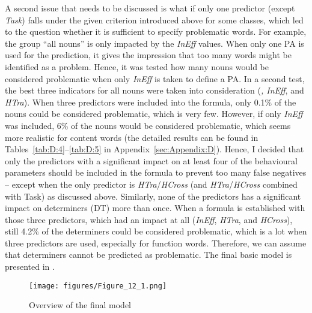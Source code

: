 A second issue that needs to be discussed is what if only one predictor (except \textit{Task}) falls under the given criterion introduced above for some  classes, which led to the question whether it is sufficient to specify problematic words. For example, the  group “all nouns” is only impacted by the \textit{InEff} values. When only one PA is used for the prediction, it gives the impression that too many words might be identified as a problem. Hence, it was tested how many nouns would be considered problematic when only \textit{InEff} is taken to define a PA. In a second test, the best three indicators for all nouns were taken into consideration (\textit{, InEff}, and \textit{HTra}). When three predictors were included into the formula, only 0.1\% of the nouns could be considered problematic, which is very few. However, if only \textit{InEff} was included, 6\% of the nouns would be considered problematic, which seems more realistic for content words (the detailed results can be found in Tables~\ref{tab:D:4}--\ref{tab:D:5} in Appendix~\ref{sec:Appendix:D}). Hence, I decided that only the predictors with a significant impact on at least four of the behavioural parameters should be included in the formula to prevent too many false negatives – except when the only predictor is \textit{HTra}/\textit{HCross} (and \textit{HTra}/\textit{HCross} combined with Task) as discussed above. Similarly, none of the predictors has a significant impact on determiners (DT) more than once. When a formula is established with those three predictors, which had an impact at all (\textit{InEff}, \textit{HTra}, and \textit{HCross}), still 4.2\% of the determiners could be considered problematic, which is a lot when three predictors are used, especially for function words. Therefore, we can assume that determiners cannot be predicted as problematic. The final basic model is presented in .


\begin{figure}
\texttt{[image: figures/Figure\_12\_1.png]}
\caption{Overview of the final model}
\label{fig:12:1}
\end{figure}

  

